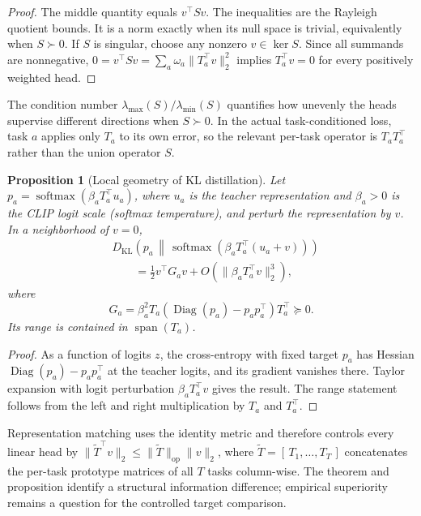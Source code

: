 \documentclass[letterpaper]{article} %
\theoremstyle{plain}
\newtheorem{proposition}[theorem]{Proposition}
\theoremstyle{definition}
\begin{document}
\begin{proof}
The middle quantity equals $v^\top Sv$.
The inequalities are the Rayleigh quotient bounds.
It is a norm exactly when its null space is trivial, equivalently when $S\succ0$.
If $S$ is singular, choose any nonzero $v\in\ker S$.
Since all summands are nonnegative, $0=v^\top Sv=\sum_a\omega_a\|T_a^\top v\|_2^2$ implies $T_a^\top v=0$ for every positively weighted head.
\end{proof}

The condition number $\lambda_{\max}(S)/\lambda_{\min}(S)$ quantifies how unevenly the heads supervise different directions when $S\succ0$.
In the actual task-conditioned loss, task $a$ applies only $T_a$ to its own error, so the relevant per-task operator is $T_aT_a^\top$ rather than the union operator $S$.

\begin{proposition}[Local geometry of KL distillation]
\label{prop:kl-geometry}
Let $p_a=\operatorname{softmax}(\beta_aT_a^\top u_a)$, where $u_a$ is the teacher representation and $\beta_a>0$ is the CLIP logit scale (softmax temperature), and perturb the representation by $v$.
In a neighborhood of $v=0$,
\begin{align}
&D_{\mathrm{KL}}\!\left(
 p_a\,\middle\|\,
 \operatorname{softmax}(\beta_aT_a^\top(u_a+v))
 \right) \\
&\qquad=
\frac12 v^\top G_a v
+O\!\left(\|\beta_aT_a^\top v\|_2^3\right),
\label{eq:kl-expansion}
\end{align}
where
\begin{equation}
G_a=\beta_a^2T_a
\left(\operatorname{Diag}(p_a)-p_ap_a^\top\right)T_a^\top\succeq0.
\label{eq:kl-metric}
\end{equation}
Its range is contained in $\operatorname{span}(T_a)$.
\end{proposition}

\begin{proof}
As a function of logits $z$, the cross-entropy with fixed target $p_a$ has Hessian $\operatorname{Diag}(p_a)-p_ap_a^\top$ at the teacher logits, and its gradient vanishes there.
Taylor expansion with logit perturbation $\beta_aT_a^\top v$ gives the result.
The range statement follows from the left and right multiplication by $T_a$ and $T_a^\top$.
\end{proof}

Representation matching uses the identity metric and therefore controls every linear head by $\|\widetilde T^\top v\|_2\le\|\widetilde T\|_{\mathrm{op}}\|v\|_2$, where $\widetilde T=[\,T_1,\dots,T_T\,]$ concatenates the per-task prototype matrices of all $T$ tasks column-wise.
The theorem and proposition identify a structural information difference; empirical superiority remains a question for the controlled target comparison.
\end{document}
